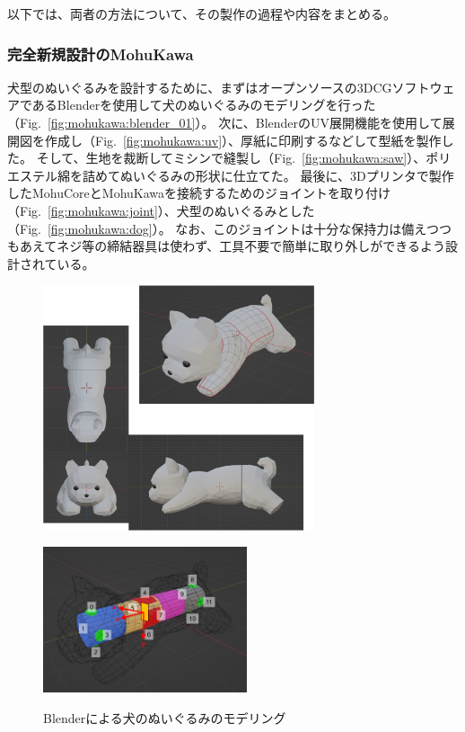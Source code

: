 \documentclass[uplatex,a4paper,12pt]{jsarticle}
\renewcommand{\figurename}{Fig.}
\newcommand{\figref}[1]{\figurename~\ref{#1}}
\begin{document}
以下では、両者の方法について、その製作の過程や内容をまとめる。

\subsubsection{完全新規設計のMohuKawa}

犬型のぬいぐるみを設計するために、まずはオープンソースの3DCGソフトウェアであるBlenderを使用して犬のぬいぐるみのモデリングを行った（\figref{fig:mohukawa:blender_01}）。
次に、BlenderのUV展開機能を使用して展開図を作成し（\figref{fig:mohukawa:uv}）、厚紙に印刷するなどして型紙を製作した。
そして、生地を裁断してミシンで縫製し（\figref{fig:mohukawa:saw}）、ポリエステル綿を詰めてぬいぐるみの形状に仕立てた。
最後に、3Dプリンタで製作したMohuCoreとMohuKawaを接続するためのジョイントを取り付け（\figref{fig:mohukawa:joint}）、犬型のぬいぐるみとした（\figref{fig:mohukawa:dog}）。
なお、このジョイントは十分な保持力は備えつつもあえてネジ等の締結器具は使わず、工具不要で簡単に取り外しができるよう設計されている。

\begin{figure}[htbp]
  \centering
  \begin{minipage}[c]{0.56\linewidth}
    \centering
    \includegraphics[keepaspectratio,width=8cm,clip]{images/mohukawa/blender_01.png}
    \label{fig:mohukawa:blender_01}
  \end{minipage}
  \begin{minipage}[c]{0.40\linewidth}
    \centering
    \includegraphics[keepaspectratio,width=6cm,clip]{images/mohukawa/dog_sensor.png}
    \label{fig:mohukawa:blender_02}
  \end{minipage}
  \caption{Blenderによる犬のぬいぐるみのモデリング}
  \label{fig:mohukawa:blender}
\end{figure}
\end{document}
